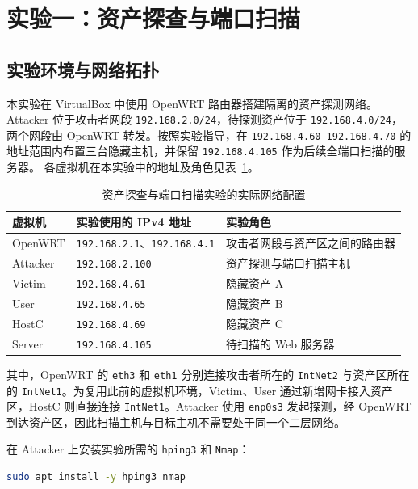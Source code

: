 \section{实验一：资产探查与端口扫描}

\subsection{实验环境与网络拓扑}

本实验在 VirtualBox 中使用 OpenWRT 路由器搭建隔离的资产探测网络。Attacker 位于攻击者网段 \texttt{192.168.2.0/24}，待探测资产位于 \texttt{192.168.4.0/24}，两个网段由 OpenWRT 转发。按照实验指导，在 \texttt{192.168.4.60--192.168.4.70} 的地址范围内布置三台隐藏主机，并保留 \texttt{192.168.4.105} 作为后续全端口扫描的服务器。
各虚拟机在本实验中的地址及角色见表~\ref{tab:task1-network}。

\begin{table}[H]
    \centering
    \caption{资产探查与端口扫描实验的实际网络配置}
    \label{tab:task1-network}
    \renewcommand{\arraystretch}{1.2}
    \begin{tabularx}{\linewidth}{l l X}
        \toprule
        虚拟机 & 实验使用的 IPv4 地址 & 实验角色 \\
        \midrule
        OpenWRT & \texttt{192.168.2.1}、\texttt{192.168.4.1} & 攻击者网段与资产区之间的路由器 \\
        Attacker & \texttt{192.168.2.100} & 资产探测与端口扫描主机 \\
        Victim & \texttt{192.168.4.61} & 隐藏资产 A \\
        User & \texttt{192.168.4.65} & 隐藏资产 B \\
        HostC & \texttt{192.168.4.69} & 隐藏资产 C \\
        Server & \texttt{192.168.4.105} & 待扫描的 Web 服务器 \\
        \bottomrule
    \end{tabularx}
\end{table}

其中，OpenWRT 的 \texttt{eth3} 和 \texttt{eth1} 分别连接攻击者所在的 \texttt{IntNet2} 与资产区所在的 \texttt{IntNet1}。为复用此前的虚拟机环境，Victim、User 通过新增网卡接入资产区，HostC 则直接连接 \texttt{IntNet1}。Attacker 使用 \texttt{enp0s3} 发起探测，经 OpenWRT 到达资产区，因此扫描主机与目标主机不需要处于同一个二层网络。

在 Attacker 上安装实验所需的 \texttt{hping3} 和 \texttt{Nmap}：

\begin{lstlisting}[language=bash,caption={安装资产探测与端口扫描工具}]
sudo apt install -y hping3 nmap
\end{lstlisting}

